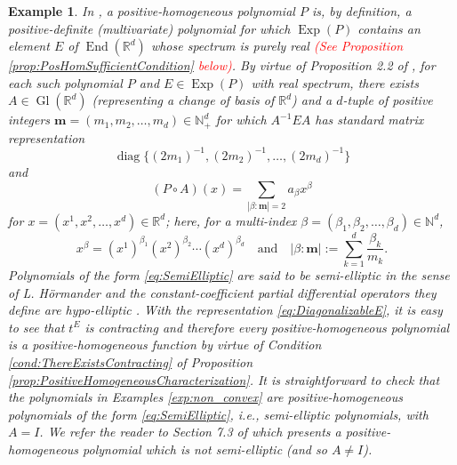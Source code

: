 \documentclass[11pt]{article}
\newtheorem{example}{Example}
\newcommand\End{\operatorname{End}} %
\newcommand\Gl{\operatorname{Gl}} %
\newcommand\Exp{\operatorname{Exp}}
\newcommand\diag{\operatorname{diag}}
\begin{document}
\begin{example}\label{exp:Polynomial}\normalfont
 In \cite{Randles2017}, a positive-homogeneous polynomial $P$ is, by definition, a positive-definite (multivariate) polynomial for which $\Exp(P)$ contains an element $E$ of $\End(\mathbb{R}^d)$ whose spectrum is purely real \textcolor{red}{(See Proposition \ref{prop:PosHomSufficientCondition} below)}. By virtue of Proposition 2.2 of \cite{Randles2017}, for each such polynomial $P$ and $E\in\Exp(P)$ with real spectrum, there exists $A\in\Gl(\mathbb{R}^d)$ (representing a change of basis of $\mathbb{R}^d$) and a $d$-tuple of positive integers $\mathbf{m}=(m_1,m_2,\dots,m_d)\in\mathbb{N}_+^d$ for which $A^{-1}EA$ has standard matrix representation
\begin{equation}\label{eq:DiagonalizableE}
\diag\{(2m_1)^{-1},(2m_2)^{-1},\dots,(2m_d)^{-1}\}
\end{equation}
and
\begin{equation}\label{eq:SemiElliptic}
(P\circ A)(x)=\sum_{|\beta:\mathbf{m}|=2}a_\beta x^\beta
\end{equation}
for $x=(x^1,x^2,\dots,x^d)\in\mathbb{R}^d$; here, for a multi-index $\beta=(\beta_1,\beta_2,\dots,\beta_d)\in\mathbb{N}^d$,
\begin{equation*}
x^{\beta}=(x^1)^{\beta_1}(x^2)^{\beta_2}\cdots (x^d)^{\beta_d} \quad \mbox{and} \quad |\beta:\mathbf{m}|:=\sum_{k=1}^d\frac{\beta_k}{m_k}.
\end{equation*}
Polynomials of the form \eqref{eq:SemiElliptic} are said to be semi-elliptic in the sense of L. H\"{o}rmander and the constant-coefficient partial differential operators they define are hypo-elliptic \cite{Hormander1983}. With the representation \eqref{eq:DiagonalizableE}, it is easy to see that $t^{E}$ is contracting and therefore every positive-homogeneous polynomial is a positive-homogeneous function by virtue of Condition \ref{cond:ThereExistsContracting} of Proposition \ref{prop:PositiveHomogeneousCharacterization}. It is straightforward to check that the polynomials in Examples \ref{exp:non_convex} are positive-homogeneous polynomials of the form \eqref{eq:SemiElliptic}, i.e., semi-elliptic polynomials, with $A=I$. We refer the reader to Section 7.3 of \cite{Randles2017} which presents a positive-homogeneous polynomial which is not semi-elliptic (and so $A\neq I$).
\end{example}
\end{document}

